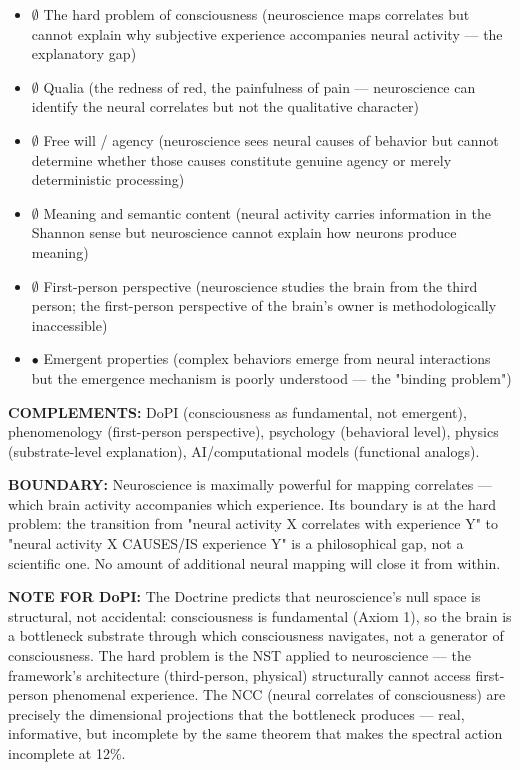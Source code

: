 \begin{itemize}[nosep,leftmargin=*]
  \item $\emptyset$ The hard problem of consciousness (neuroscience maps correlates but cannot explain why subjective experience accompanies neural activity — the explanatory gap)
  \item $\emptyset$ Qualia (the redness of red, the painfulness of pain — neuroscience can identify the neural correlates but not the qualitative character)
  \item $\emptyset$ Free will / agency (neuroscience sees neural causes of behavior but cannot determine whether those causes constitute genuine agency or merely deterministic processing)
  \item $\emptyset$ Meaning and semantic content (neural activity carries information in the Shannon sense but neuroscience cannot explain how neurons produce meaning)
  \item $\emptyset$ First-person perspective (neuroscience studies the brain from the third person; the first-person perspective of the brain's owner is methodologically inaccessible)
  \item $\bullet$ Emergent properties (complex behaviors emerge from neural interactions but the emergence mechanism is poorly understood — the "binding problem")
\end{itemize}


\textbf{COMPLEMENTS:} DoPI (consciousness as fundamental, not emergent), phenomenology (first-person perspective), psychology (behavioral level), physics (substrate-level explanation), AI/computational models (functional analogs).


\textbf{BOUNDARY:} Neuroscience is maximally powerful for mapping correlates — which brain activity accompanies which experience. Its boundary is at the hard problem: the transition from "neural activity X correlates with experience Y" to "neural activity X CAUSES/IS experience Y" is a philosophical gap, not a scientific one. No amount of additional neural mapping will close it from within.


\textbf{NOTE FOR DoPI:} The Doctrine predicts that neuroscience's null space is structural, not accidental: consciousness is fundamental (Axiom 1), so the brain is a bottleneck substrate through which consciousness navigates, not a generator of consciousness. The hard problem is the NST applied to neuroscience — the framework's architecture (third-person, physical) structurally cannot access first-person phenomenal experience. The NCC (neural correlates of consciousness) are precisely the dimensional projections that the bottleneck produces — real, informative, but incomplete by the same theorem that makes the spectral action incomplete at 12\%.



